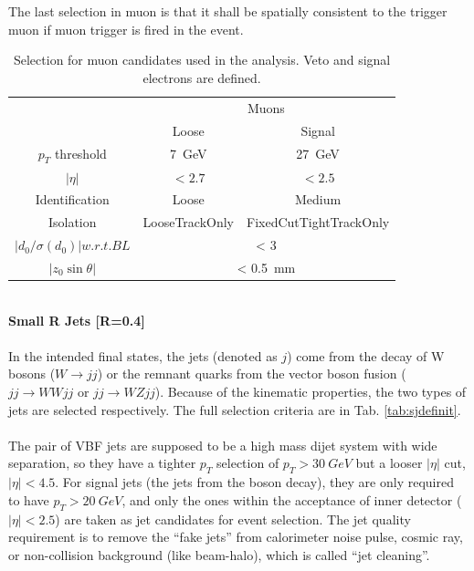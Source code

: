 \\
\\The last selection in muon is that it shall be spatially consistent to the trigger muon if muon trigger is fired in the event. 
\begin{table}[htb]
	\caption{Selection for muon candidates used in the analysis. Veto and signal electrons are defined.}\label{Tab:mudefin}
	\centering
	\begin{tabular}{|c||c|c|}
   \hline
& \multicolumn{2}{c|}{Muons}\\
\cline{2-3}
&  Loose & Signal  \\
\hline
$p_T$ threshold &  7~GeV & 27~GeV  \\
\hline
$| \eta |$      &  $< 2.7$ & $< 2.5$   \\
\hline
Identification  &  Loose & Medium  \\
\hline
Isolation       &   LooseTrackOnly & FixedCutTightTrackOnly  \\
\hline
$|d_0/\sigma(d_0)| w.r.t. BL$ &   \multicolumn{2}{|c|}{< 3} \\
\hline
$|z_0\sin\theta| $ &   \multicolumn{2}{|c|}{< 0.5~mm} \\
\hline
	\end{tabular}
\end{table}
\noindent
\\{\bf Small R Jets [R=0.4]}
\\
\\In the intended final states, the jets (denoted as $j$) come from the decay of W bosons ($W\to jj$) or the remnant quarks from the vector boson fusion ($jj\to WWjj$ or $jj \to WZjj$). Because of the kinematic properties, the two types of jets are selected respectively. The full selection criteria are in Tab. \ref{tab:sjdefinit}.
\\
\\The pair of VBF jets are supposed to be a high mass dijet system with wide separation, so they have a tighter $p_{T}$ selection of $p_{T}>30~GeV$ but a looser $|\eta|$ cut, $|\eta|<4.5$. For signal jets (the jets from the boson decay), they are only required to have $p_{T}>20~GeV$, and only the ones within the acceptance of inner detector ($|\eta|<2.5$) are taken as jet candidates for event selection. The jet quality requirement is to remove the ``fake jets'' from calorimeter noise pulse, cosmic ray, or non-collision background (like beam-halo), which is called ``jet cleaning''\cite{ATLAS:2010vza}.

